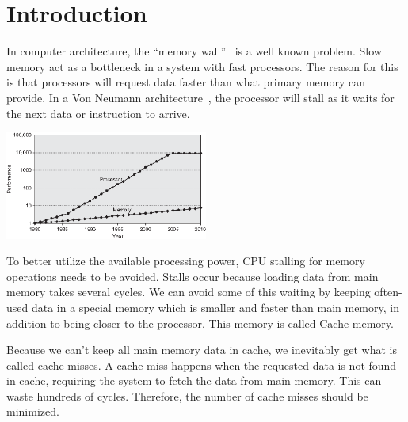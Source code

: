 \section{Introduction} %


In computer architecture, the ``memory wall''~\cite{wulf_mckee_1995}
is a well known problem. Slow memory act as a bottleneck in a system
with fast processors. The reason for this is that processors will
request data faster than what primary memory can provide. In a Von
Neumann architecture~\cite{von1992first}, the processor
will stall as it waits for the next data or instruction to arrive.

\begin{center}
  \includegraphics[width=0.5\textwidth]{graphs/memorywall}
\end{center}

To better utilize the available processing power, CPU stalling for
memory operations needs to be avoided. Stalls occur because loading
data from main memory takes several cycles. We can avoid some of this
waiting by keeping often-used data in a special memory which is
smaller and faster than main memory, in addition to being closer to
the processor. This memory is called Cache memory.

Because we can't keep all main memory data in cache, we inevitably get
what is called cache misses. A cache miss happens when the requested
data is not found in cache, requiring the system to fetch the data
from main memory. This can waste hundreds of cycles. Therefore, the
number of cache misses should be minimized.


